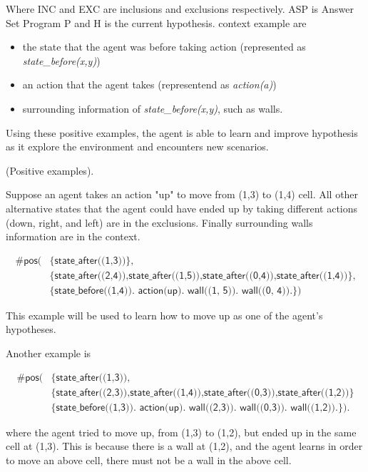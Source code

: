 Where INC and EXC are inclusions and exclusions respectively. ASP is Answer Set Program P and H is the current hypothesis. 
context example are
\begin{itemize}
    \item the state that the agent was before taking action (represented as \textit{state\_before(x,y)})
    \item an action that the agent takes (representend as \textit{action(a)})
    \item surrounding information of \textit{state\_before(x,y)}, such as walls. 
\end{itemize}


Using these positive examples, the agent is able to learn and improve hypothesis as it explore the environment and encounters new scenarios. 

\begin{examp} \normalfont (Positive examples). 

Suppose an agent takes an action "up" to move from (1,3) to (1,4) cell. All other alternative states that the agent could have ended up by taking different actions 
(down, right, and left) are in the exclusions. Finally surrounding walls information are in the context.

\begin{equation*}
\begin{split}
    \textsf{\#pos(} & \textsf{\{state\_after((1,3))\},}\\
                    & \textsf{\{state\_after((2,4)),state\_after((1,5)),state\_after((0,4)),state\_after((1,4))\},} \\
    & \textsf{\{state\_before((1,4)). action(up). wall((1, 5)). wall((0, 4)).\})}
\end{split}
\end{equation*}

This example will be used to learn how to move up as one of the agent's hypotheses.

Another example is 

\begin{equation*}
\begin{split}
\textsf{\#pos(} & \textsf{\{state\_after((1,3))}, \\ 
                & \textsf{\{state\_after((2,3)),state\_after((1,4)),state\_after((0,3)),state\_after((1,2))\}} \\       
                & \textsf{\{state\_before((1,3)). action(up). wall((2,3)). wall((0,3)). wall((1,2)).\}).}
\end{split}
\end{equation*}

where the agent tried to move up, from (1,3) to (1,2), but ended up in the same cell at (1,3). This is because there is a wall at (1,2), and the agent learns in order to move an above cell,
there must not be a wall in the above cell. 

\end{examp}
\label{state_transition_example}

